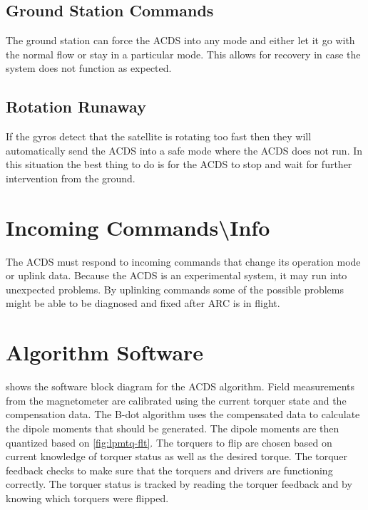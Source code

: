 \subsection{Ground Station Commands}

The ground station can force the \ac{ACDS} into any mode and either let it go with the normal flow or stay in a particular mode. This allows for recovery in case the system does not function as expected.

\subsection{Rotation Runaway}

If the gyros detect that the satellite is rotating too fast then they will automatically send the \ac{ACDS} into a safe mode where the \ac{ACDS} does not run. In this situation the best thing to do is for the \ac{ACDS} to stop and wait for further intervention from the ground.

\section{Incoming Commands\textbackslash Info}

The \ac{ACDS} must respond to incoming commands that change its operation mode or uplink data. Because the \ac{ACDS} is an experimental system, it may run into unexpected problems. By uplinking commands some of the possible problems might be able to be diagnosed and fixed after \ac{ARC} is in flight. 
\section{Algorithm Software}

 shows the software block diagram for the \ac{ACDS} algorithm. Field measurements from the magnetometer are calibrated using the current torquer state and the compensation data. The B-dot algorithm uses the compensated data to calculate the dipole moments that should be generated. The dipole moments are then quantized based on \cref{fig:lpmtq-flt}. The torquers to flip are chosen based on current knowledge of torquer status as well as the desired torque. The torquer feedback checks to make sure that the torquers and drivers are functioning correctly. The torquer status is tracked by reading the torquer feedback and by knowing which torquers were flipped.


